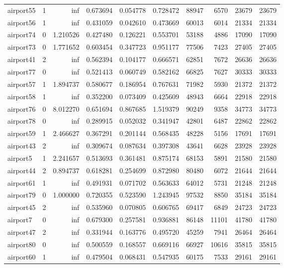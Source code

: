 \begin{longtable}{|l|r|r|r|r|r|r|r|r|r|}
airport55 & 1 & inf & 0.673694 & 0.054778 & 0.728472 & 88947 & 6570 & 23679 & 23679 \\
airport56 & 1 & inf & 0.431059 & 0.042610 & 0.473669 & 60013 & 6014 & 21334 & 21334 \\
airport74 & 0 & 1.210526 & 0.427480 & 0.126221 & 0.553701 & 53188 & 4886 & 17090 & 17090 \\
airport73 & 0 & 1.771652 & 0.603454 & 0.347723 & 0.951177 & 77506 & 7423 & 27405 & 27405 \\
airport41 & 2 & inf & 0.562394 & 0.104177 & 0.666571 & 62851 & 7672 & 26636 & 26636 \\
airport77 & 0 & inf & 0.521413 & 0.060749 & 0.582162 & 66825 & 7627 & 30333 & 30333 \\
airport57 & 1 & 1.894737 & 0.580677 & 0.186954 & 0.767631 & 71982 & 5930 & 21372 & 21372 \\
airport58 & 1 & inf & 0.352200 & 0.073409 & 0.425609 & 48943 & 6664 & 22918 & 22918 \\
airport76 & 0 & 8.012270 & 0.651694 & 0.867685 & 1.519379 & 90249 & 9358 & 34773 & 34773 \\
airport78 & 0 & inf & 0.289915 & 0.052032 & 0.341947 & 42801 & 6487 & 22862 & 22862 \\
airport59 & 1 & 2.466627 & 0.367291 & 0.201144 & 0.568435 & 48228 & 5156 & 17691 & 17691 \\
airport43 & 2 & inf & 0.309674 & 0.087634 & 0.397308 & 43641 & 6628 & 23928 & 23928 \\
airport5 & 1 & 2.241657 & 0.513693 & 0.361481 & 0.875174 & 68153 & 5891 & 21580 & 21580 \\
airport44 & 2 & 0.894737 & 0.618281 & 0.254699 & 0.872980 & 80480 & 6072 & 21644 & 21644 \\
airport61 & 1 & inf & 0.491931 & 0.071702 & 0.563633 & 64012 & 5731 & 21248 & 21248 \\
airport79 & 0 & 1.000000 & 0.720355 & 0.523590 & 1.243945 & 97532 & 8850 & 35184 & 35184 \\
airport45 & 2 & inf & 0.535960 & 0.070805 & 0.606765 & 69417 & 6849 & 24723 & 24723 \\
airport7 & 0 & inf & 0.679300 & 0.257581 & 0.936881 & 86148 & 11101 & 41780 & 41780 \\
airport47 & 2 & inf & 0.331944 & 0.163776 & 0.495720 & 45259 & 7941 & 26464 & 26464 \\
airport80 & 0 & inf & 0.500559 & 0.168557 & 0.669116 & 66927 & 10616 & 35815 & 35815 \\
airport60 & 1 & inf & 0.479504 & 0.068431 & 0.547935 & 60175 & 7533 & 29161 & 29161 \\

\end{longtable}
